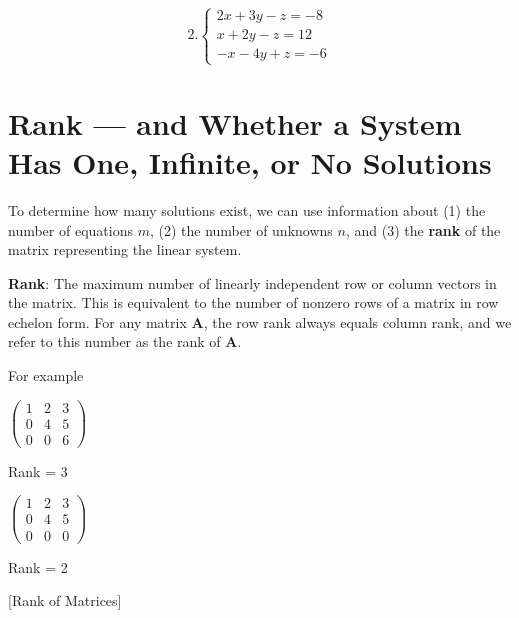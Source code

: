 \documentclass[]{book}
\theoremstyle{definition}
\theoremstyle{definition}
\theoremstyle{definition}
\theoremstyle{remark}
\begin{document}
\[
  2. \begin{cases}
               2x + 3y - z = -8\\
               x + 2y - z = 12\\
             -x -4y + z = -6
            \end{cases}
               \]

\hypertarget{rank-and-whether-a-system-has-one-infinite-or-no-solutions}{%
\section{Rank --- and Whether a System Has One, Infinite, or No Solutions}\label{rank-and-whether-a-system-has-one-infinite-or-no-solutions}}

To determine how many solutions exist, we can use information about (1) the number of equations \(m\), (2) the number of unknowns \(n\), and (3) the \textbf{rank} of the matrix representing the linear system.

\textbf{Rank}: The maximum number of linearly independent row or column vectors in the matrix. This is equivalent to the number of nonzero rows of a matrix in row echelon form. For any matrix \textbf{A}, the row rank always equals column rank, and we refer to this number as the rank of \textbf{A}.

For example

\(\begin{pmatrix} 1 & 2 & 3 \\  0 & 4 & 5 \\  0 & 0 & 6 \end{pmatrix}\)

Rank = 3

\(\begin{pmatrix} 1 & 2 & 3 \\ 0 & 4 & 5 \\ 0 & 0 & 0 \end{pmatrix}\)

Rank = 2

[Rank of Matrices]
\protect\hypertarget{exr:rank}{}{\label{exr:rank} {} }
\end{document}
